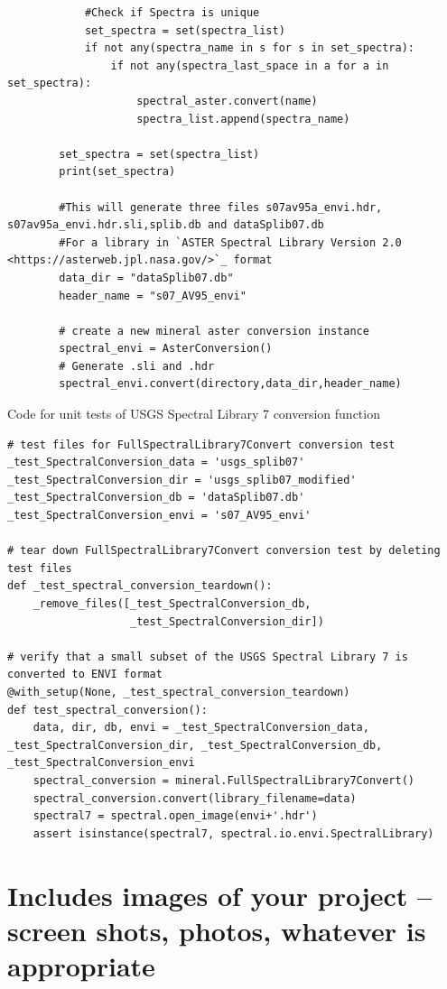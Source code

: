 \documentclass[onecolumn, draftclsnofoot,10pt, compsoc]{IEEEtran}
\begin{document}
\begin{lstlisting}
            #Check if Spectra is unique
            set_spectra = set(spectra_list)
            if not any(spectra_name in s for s in set_spectra):
                if not any(spectra_last_space in a for a in set_spectra):
                    spectral_aster.convert(name)
                    spectra_list.append(spectra_name)

        set_spectra = set(spectra_list)
        print(set_spectra)

        #This will generate three files s07av95a_envi.hdr, s07av95a_envi.hdr.sli,splib.db and dataSplib07.db
        #For a library in `ASTER Spectral Library Version 2.0 <https://asterweb.jpl.nasa.gov/>`_ format
        data_dir = "dataSplib07.db"
        header_name = "s07_AV95_envi"

        # create a new mineral aster conversion instance
        spectral_envi = AsterConversion()
        # Generate .sli and .hdr
        spectral_envi.convert(directory,data_dir,header_name)
\end{lstlisting}
Code for unit tests of USGS Spectral Library 7 conversion function
\newline
\begin{lstlisting}
# test files for FullSpectralLibrary7Convert conversion test
_test_SpectralConversion_data = 'usgs_splib07'
_test_SpectralConversion_dir = 'usgs_splib07_modified'
_test_SpectralConversion_db = 'dataSplib07.db'
_test_SpectralConversion_envi = 's07_AV95_envi'

# tear down FullSpectralLibrary7Convert conversion test by deleting test files
def _test_spectral_conversion_teardown():
    _remove_files([_test_SpectralConversion_db,
                   _test_SpectralConversion_dir])

# verify that a small subset of the USGS Spectral Library 7 is converted to ENVI format
@with_setup(None, _test_spectral_conversion_teardown)
def test_spectral_conversion():
    data, dir, db, envi = _test_SpectralConversion_data, _test_SpectralConversion_dir, _test_SpectralConversion_db, _test_SpectralConversion_envi
    spectral_conversion = mineral.FullSpectralLibrary7Convert()
    spectral_conversion.convert(library_filename=data)
    spectral7 = spectral.open_image(envi+'.hdr')
    assert isinstance(spectral7, spectral.io.envi.SpectralLibrary)
\end{lstlisting}

\section{Includes images of your project -- screen shots, photos, whatever is appropriate}
\end{document}
